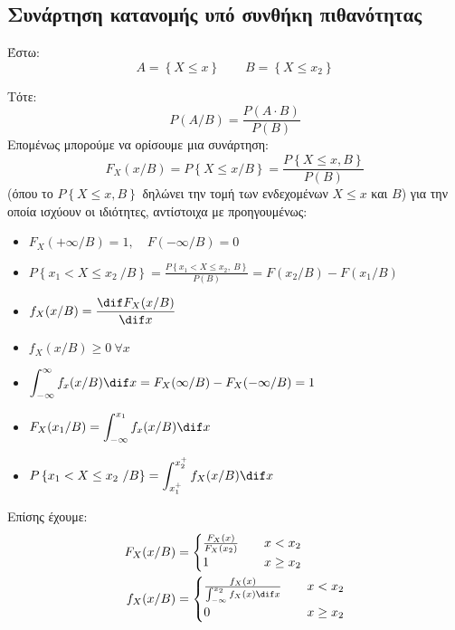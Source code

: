 \documentclass[11pt,a4paper,notitlepage,fleqn,final]{article}
\begin{document}
	\subsection{Συνάρτηση κατανομής υπό συνθήκη πιθανότητας}
	Έστω:
	\[
	A = \left\lbrace X \leq x \right\rbrace
	\qquad
	B = \left\lbrace X \leq x_2 \right\rbrace
	\]

	Τότε:
	\[
	P(A/B) = \frac{P(A\cdot B)}{P(B)}
	\]
	Επομένως μπορούμε να ορίσουμε μια συνάρτηση:
	\[
	\boxed{
		F_X(x/B) = P\left\lbrace X\leq x/B \right\rbrace
		= \frac{P\left\lbrace X\leq x, B \right\rbrace}{P(B)}
		}
	\]
	(όπου το \( P\left\{X\leq x,B\right\}  \) δηλώνει την τομή των
	ενδεχομένων \( X\leq x \) και \(B\))
	για την οποία ισχύουν οι ιδιότητες, αντίστοιχα με προηγουμένως:

	\begin{itemize}
		\item \( F_X(+\infty/B) = 1, \quad F(-\infty/B) = 0 \)
		\item \( \displaystyle
		P\left\lbrace x_1<X\leq x_2\ /B \right\rbrace
		=\frac{P\left\lbrace x_1 < X\leq x_2,\ B \right\rbrace}{P(B)}
		=F(x_2/B) - F(x_1/B) \)
		\item \( \displaystyle f_X(x/B) = \frac{\dif F_X(x/B)}{\dif x} \)
		\item \( f_X(x/B) \geq 0 \ \forall x \)
		\item \( \displaystyle
		\int_{-\infty}^{\infty} f_x(x/B) \dif x = F_X(\infty/B)
		- F_X(-\infty/B) = 1 \)
		\item \( \displaystyle F_X(x_1/B) = \int_{-\infty}^{x_1} f_x(x/B)\dif x \)
		\item \( \displaystyle P \left\lbrace x_1<X\leq x_2\ /B \right\rbrace
		= \int_{x_1^+}^{x_2^+} f_X(x/B)\dif x \)
	\end{itemize}

	Επίσης έχουμε:
	\begin{align*}
		F_X(x/B) &= \begin{cases}
		\frac{F_X(x)}{F_X(x_2)} &\quad x<x_2 \\
		1 &\quad x\geq x_2
		\end{cases} \\
		f_X(x/B) &= \begin{cases}
		\frac{f_X(x)}{\int_{-\infty}^{x_2} f_X(x) \dif x}
		&\quad x<x_2 \\ 0 &\quad x \geq x_2
		\end{cases}
	\end{align*}
\end{document}
